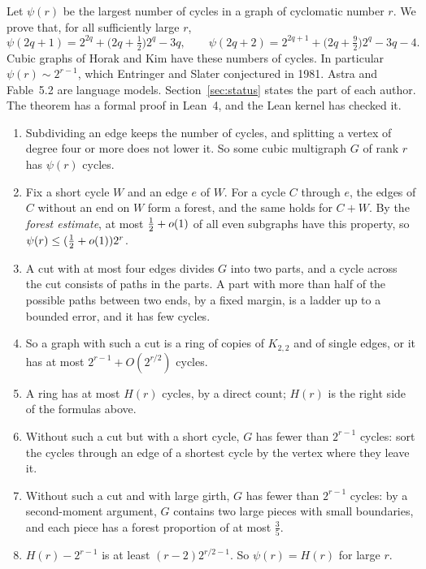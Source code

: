 \documentclass[11pt]{article}
\begin{document}
\maketitleblock

Let $\psi(r)$ be the largest number of cycles in a graph of cyclomatic number $r$. We prove that,
for all sufficiently large $r$,
\[
  \psi(2q+1)=2^{2q}+\bigl(2q+\tfrac12\bigr)2^{q}-3q,\qquad
  \psi(2q+2)=2^{2q+1}+\bigl(2q+\tfrac92\bigr)2^{q}-3q-4 .
\]
Cubic graphs of Horak and Kim have these numbers of cycles. In particular
$\psi(r)\sim2^{r-1}$, which Entringer and Slater conjectured in 1981. Astra and Fable~5.2 are
language models. Section~\ref{sec:status} states the part of each author. The theorem has a
formal proof in Lean~4, and the Lean kernel has checked it.

\begin{enumerate}[leftmargin=1.6em]
\item Subdividing an edge keeps the number of cycles, and splitting a vertex of degree four or
more does not lower it. So some cubic multigraph $G$ of rank $r$ has $\psi(r)$ cycles.
\item Fix a short cycle $W$ and an edge $e$ of $W$. For a cycle $C$ through $e$, the edges of
$C$ without an end on $W$ form a forest, and the same holds for $C+W$. By the \emph{forest
estimate}, at most $\tfrac12+o(1)$ of all even subgraphs have this property, so
$\psi(r)\le(\tfrac12+o(1))2^{r}$.
\item A cut with at most four edges divides $G$ into two parts, and a cycle across the cut
consists of paths in the parts. A part with more than half of the possible paths between two
ends, by a fixed margin, is a ladder up to a bounded error, and it has few cycles.
\item So a graph with such a cut is a ring of copies of $K_{2,2}$ and of single edges, or it has
at most $2^{r-1}+O(2^{r/2})$ cycles.
\item A ring has at most $H(r)$ cycles, by a direct count; $H(r)$ is the right side of the
formulas above.
\item Without such a cut but with a short cycle, $G$ has fewer than $2^{r-1}$ cycles: sort the
cycles through an edge of a shortest cycle by the vertex where they leave it.
\item Without such a cut and with large girth, $G$ has fewer than $2^{r-1}$ cycles: by a
second-moment argument, $G$ contains two large pieces with small boundaries, and each piece has
a forest proportion of at most $\frac35$.
\item $H(r)-2^{r-1}$ is at least $(r-2)2^{r/2-1}$. So $\psi(r)=H(r)$ for large $r$.
\end{enumerate}
\end{document}
